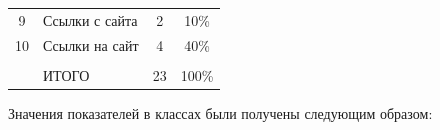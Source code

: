 \begin{table}[b]
\begin{center}
\begin{tabular}{|c|l|c|c|}
9&Ссылки с сайта&2&10\%\\


10\hphantom{9}&Ссылки на сайт&4&40\%\\


\hline


&&&\\[-9pt]


&ИТОГО&23\hphantom{9}&100\%\hphantom{9}\\


\hline


\end{tabular}


\end{center}


\end{table}








  Значения показателей в классах были получены следующим образом:


